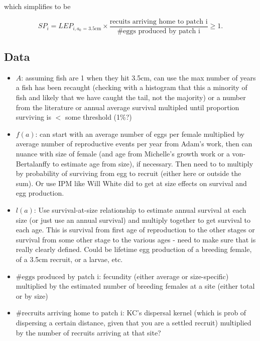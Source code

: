 \documentclass[12pt, oneside]{article}   	%
\begin{document}
which simplifies to be

\begin{equation}
SP_i = LEP_{i, \text{$a_0$ = 3.5cm}} \times \frac{\text{recuits arriving home to patch i}}{\# \text{eggs produced by patch i}} \geq 1. %
\end{equation}


\subsection*{Data}
\begin{itemize}
\item $A$: assuming fish are 1 when they hit 3.5cm, can use the max number of years a fish has been recaught (checking with a histogram that this a minority of fish and likely that we have caught the tail, not the majority) or a number from the literature or annual average survival multipled until proportion surviving is $<$ some threshold (1\%?)
\item $f(a)$: can start with an average number of eggs per female multiplied by average number of reproductive events per year from Adam's work, then can nuance with size of female (and age from Michelle's growth work or a von-Bertalanffy to estimate age from size), if necessary. Then need to to multiply by probability of surviving from egg to recruit (either here or outside the sum). Or use IPM like Will White did to get at size effects on survival and egg production. %
\item $l(a)$: Use survival-at-size relationship to estimate annual survival at each size (or just use an annual survival) and multiply together to get survival to each age. This is survival from first age of reproduction to the other stages or survival from some other stage to the various ages - need to make sure that is really clearly defined. Could be lifetime egg production of a breeding female, of a 3.5cm recruit, or a larvae, etc.
\item $\# \text{eggs produced by patch i}$: fecundity (either average or size-specific) multiplied by the estimated number of breeding females at a site (either total or by size)
\item $\# \text{recruits arriving home to patch i}$: KC's dispersal kernel  (which is prob of dispersing a certain distance, given that you are a settled recruit) multiplied by the number of recruits arriving at that site? \\

\end{itemize}
\end{document}
